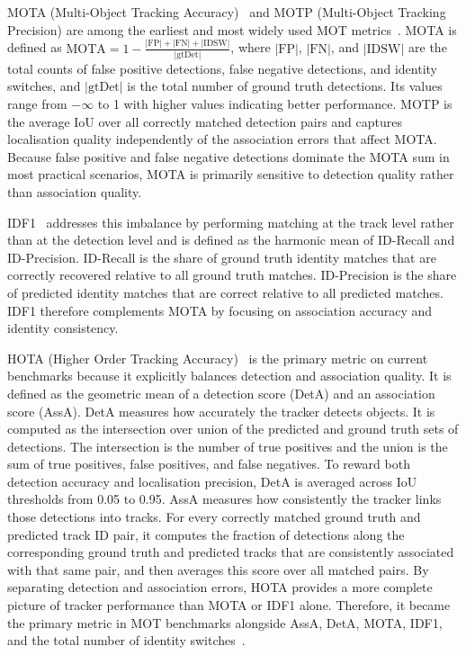\documentclass[12pt,oneside,bibtotoc,liststotoc]{scrbook}
\begin{document}
MOTA (Multi-Object Tracking Accuracy)~\cite{bernardin2006MOTAMOTP} and MOTP (Multi-Object Tracking Precision)\cite{bernardin2006MOTAMOTP} are among the
earliest and most widely used MOT metrics~\cite{advzemovic2025deepLearningMultiObjectTrackingSurvey}. MOTA is defined as $\text{MOTA} = 1 - \frac{|\text{FP}| + |\text{FN}| + |\text{IDSW}|}{|\text{gtDet}|}$,
where $|\text{FP}|$, $|\text{FN}|$, and $|\text{IDSW}|$ are the total counts of false positive
detections, false negative detections, and identity switches, and $|\text{gtDet}|$ is the total number
of ground truth detections. Its values range from $-\infty$ to 1 with higher values indicating better
performance. MOTP is the average IoU over all correctly matched detection pairs and captures
localisation quality independently of the association errors that affect MOTA. Because false positive
and false negative detections dominate the MOTA sum in most practical scenarios, MOTA is primarily
sensitive to detection quality rather than association quality.


IDF1~\cite{ristani2016IDF1} addresses this imbalance by performing matching at the track level rather than at the detection
level and is defined as the harmonic mean of ID-Recall and ID-Precision. ID-Recall is the share of
ground truth identity matches that are correctly recovered relative to all ground truth matches.
ID-Precision is the share of predicted identity matches that are correct relative to all predicted
matches. IDF1 therefore complements MOTA by focusing on association accuracy and identity consistency.

HOTA (Higher Order Tracking Accuracy)~\cite{luiten2021HOTA} is the primary metric on current benchmarks because it
explicitly balances detection and association quality. It is defined as the geometric mean of a
detection score (DetA) and an association score (AssA). DetA measures how accurately the tracker
detects objects. It is computed as the intersection over union of the predicted and ground truth sets of
detections. The intersection is the number of true
positives and the union is the sum of true positives, false positives, and false negatives.
To reward both detection accuracy and localisation precision, DetA is averaged across IoU
thresholds from 0.05 to 0.95. AssA measures how consistently the tracker links those detections into tracks.
For every correctly matched ground truth and predicted track ID pair, it computes the fraction of
detections along the corresponding ground truth and predicted tracks that are consistently associated
with that same pair, and then averages this score over all matched pairs. By separating detection and association errors,
HOTA provides a more complete picture of tracker
performance than MOTA or IDF1 alone. Therefore, it became the primary metric in MOT benchmarks alongside
AssA, DetA, MOTA, IDF1, and the total number of identity switches~\cite{advzemovic2025deepLearningMultiObjectTrackingSurvey}.
\end{document}
